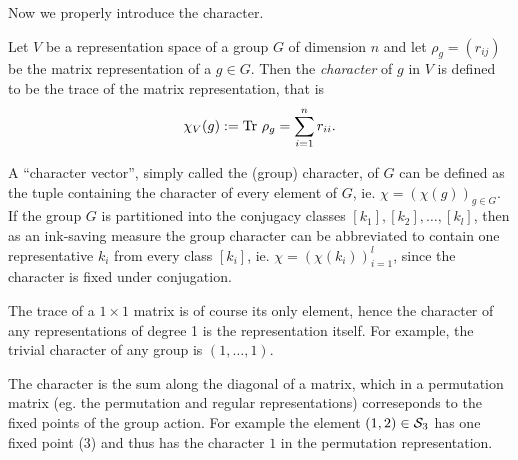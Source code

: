 Now we properly introduce the character.

\begin{definition}\label{def:char}
	Let $V$ be a representation space of a group $G$ of dimension $n$ and let $\rho_g = (r_{ij})$ be the matrix representation of a $g \in G$. Then the \emph{character} of $g$ in $V$ is defined to be the trace of the matrix representation, that is 
	\begin{align*}
		\chi_V(g) := \text{Tr } \rho_g = \sum_{i=1}^{n} r_{ii}.
	\end{align*}
\end{definition}


\begin{notation}
	A ``character vector'', simply called the (group) character, of $G$ can be defined as the tuple containing the character of every element of $G$, ie. $\chi = (\chi(g))_{g \in G}$. If the group $G$ is partitioned into the conjugacy classes $[k_1], [k_2], \dots, [k_l]$, then as an ink-saving measure the group character can be abbreviated to contain one representative $k_i$ from every class $[k_i]$, ie. $\chi= (\chi(k_i))_{i=1}^l$, since the character is fixed under conjugation.%
\end{notation}

\begin{example}
	The  trace of a $1 \times 1$ matrix is of course its only element, hence the character of any representations of degree 1 is the representation itself.
	For example, the trivial character of any group is $(1, \dots, 1)$. 
\end{example}

\begin{example}\label{example:charperm}
	The character is the sum along the diagonal of a matrix, which in a permutation matrix (eg. the permutation and regular representations) correseponds to the fixed points of the group action. For example the element $(1,2) \in \mathcal{S}_3$ has one fixed point ($3$) and thus has the character $1$ in the permutation representation. 
\end{example}

